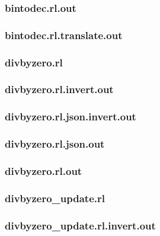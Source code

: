 \subsubsection{bintodec.rl.out}
\label{app:bintodec_rl.out}

\subsubsection{bintodec.rl.translate.out}
\label{app:bintodec_rl.translate.out}

\subsubsection{divbyzero.rl}
\label{app:divbyzero_rl}

\subsubsection{divbyzero.rl.invert.out}
\label{app:divbyzero_rl.invert.out}

\subsubsection{divbyzero.rl.json.invert.out}
\label{app:divbyzero_rl.json.invert.out}

\subsubsection{divbyzero.rl.json.out}
\label{app:divbyzero_rl.json.out}

\subsubsection{divbyzero.rl.out}
\label{app:divbyzero_rl.out}

\subsubsection{divbyzero\_update.rl}
\label{app:divbyzero_update_rl}

\subsubsection{divbyzero\_update.rl.invert.out}
\label{app:divbyzero_update_rl.invert.out}

